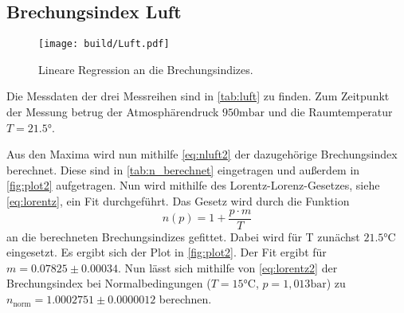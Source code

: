 % 


\subsection{Brechungsindex Luft}
\begin{figure}
    \centering
    \texttt{[image: build/Luft.pdf]}
    \caption{Lineare Regression an die Brechungsindizes.}
    \label{fig:plot2}
\end{figure}
Die Messdaten der drei Messreihen sind in \autoref{tab:luft} zu finden.
Zum Zeitpunkt der Messung betrug der Atmosphärendruck $950 \unit{\milli\bar}$ und die Raumtemperatur $T = 21.5 \unit\degree$.


Aus den Maxima wird nun mithilfe \autoref{eq:nluft2} der dazugehörige Brechungsindex berechnet.
Diese sind in \autoref{tab:n_berechnet} eingetragen und außerdem in \autoref{fig:plot2} aufgetragen.
Nun wird mithilfe des Lorentz-Lorenz-Gesetzes, siehe \autoref{eq:lorentz}, ein Fit durchgeführt.
Das Gesetz wird durch die Funktion
\begin{equation} \label{eq:lorentz2}
    n(p) = 1 + \frac{p \cdot m}{T}
\end{equation}
an die berechneten Brechungsindizes gefittet. Dabei wird für T zunächst $21.5\unit{\celsius}$ eingesetzt.
Es ergibt sich der Plot in \autoref{fig:plot2}.
Der Fit ergibt für $m = 0.07825 \pm 0.00034$.
Nun lässt sich mithilfe von \autoref{eq:lorentz2} der Brechungsindex bei Normalbedingungen ($T = 15 \unit{\celsius}$, $p = 1,013 \unit{\bar}$) zu $n_{\text{norm}} = 1.0002751 \pm 0.0000012$ berechnen.